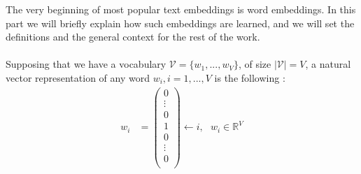 \documentclass{article}
\newcommand{\R}{\mathbb R}
\begin{document}
The very beginning of most popular
text embeddings is word embeddings. In this part
we will briefly explain how such embeddings are learned, and we will
set the definitions and the general context for the rest of the 
work. \\ \\
Supposing that we have a vocabulary 
$\mathcal{V} = \{w_1, ..., w_V \}$, of size 
$| \mathcal{V} | = V$, a natural vector representation of any word 
$w_i, i=1, ..., V$ is the following :
\begin{align*}
    w_i &= 
    \left (
    \begin{array}{c}
        0 \\
        \vdots \\
        0 \\
        1 \\
        0 \\
        \vdots \\
        0 \\
    \end{array}
    \right ) \leftarrow i,\ \ \ w_i \in \R^V
\end{align*}
\end{document}

